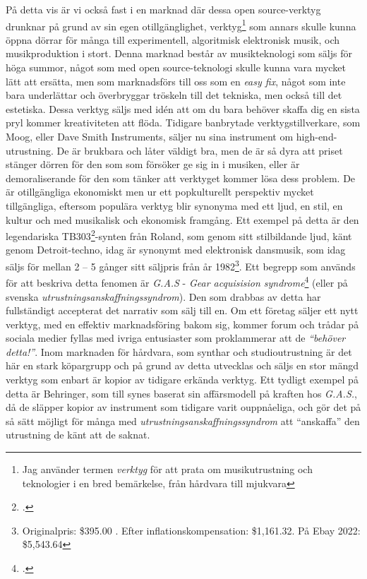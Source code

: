 \documentclass{article}
\begin{document}
På detta vis är vi också fast i en marknad där dessa open source-verktyg drunknar på grund av sin egen
otillgänglighet, verktyg\footnote{Jag använder termen \emph{verktyg} för att prata om musikutrustning och
teknologier i en bred bemärkelse, från hårdvara till mjukvara} som annars skulle kunna öppna dörrar för många
till experimentell, algoritmisk elektronisk musik, och musikproduktion i stort. Denna marknad består av
musikteknologi som säljs för höga summor, något som med open source-teknologi skulle kunna vara mycket lätt
att ersätta, men som marknadsförs till oss som en \emph{easy fix}, något som inte bara underlättar och
överbryggar tröskeln till det tekniska, men också till det estetiska. Dessa verktyg säljs med idén att om du
bara behöver skaffa dig en sista pryl kommer kreativiteten att flöda. Tidigare banbrytade verktygstillverkare,
som Moog, eller Dave Smith Instruments, säljer nu sina instrument om high-end-utrustning. De är brukbara och
låter väldigt bra, men de är så dyra att priset stänger dörren för den som som försöker ge sig in i musiken,
eller är demoraliserande för den som tänker att verktyget kommer lösa dess problem. De är otillgängliga
ekonomiskt men ur ett popkulturellt perspektiv mycket tillgängliga, eftersom populära verktyg blir synonyma
med ett ljud, en stil, en kultur och med musikalisk och ekonomisk framgång. Ett exempel på detta är den
legendariska TB303\footcite{303}-synten från Roland, som genom sitt stilbildande ljud, känt genom
Detroit-techno, idag är synonymt med elektronisk dansmusik, som idag säljs för mellan 2 -- 5 gånger sitt
säljpris från år 1982\footnote{Originalpris: \$395.00 . Efter inflationskompensation: \$1,161.32. På Ebay
2022: \$5,543.64}. Ett begrepp som används för att beskriva detta fenomen är \emph{G.A.S} - \emph{Gear
acquisision syndrome}\footcite{gas} (eller på svenska \emph{utrustningsanskaffningssyndrom}). Den som drabbas
av detta har fullständigt accepterat det narrativ som sälj till en.
Om ett företag säljer ett nytt verktyg, med en effektiv marknadsföring bakom sig, kommer forum och trådar på
sociala medier fyllas med ivriga entusiaster som proklammerar att de \emph{``behöver detta!''}. Inom marknaden
för hårdvara, som synthar och studioutrustning är det här en stark köpargrupp och på grund av detta utvecklas
och säljs en stor mängd verktyg som enbart är kopior av tidigare erkända verktyg. Ett tydligt exempel på detta
är Behringer, som till synes baserat sin affärsmodell på kraften hos \emph{G.A.S.}, då de släpper kopior av
instrument som tidigare varit ouppnåeliga, och gör det på så sätt möjligt för många med
\emph{utrustningsanskaffningssyndrom} att ``anskaffa'' den utrustning de känt att de saknat.
\end{document}
